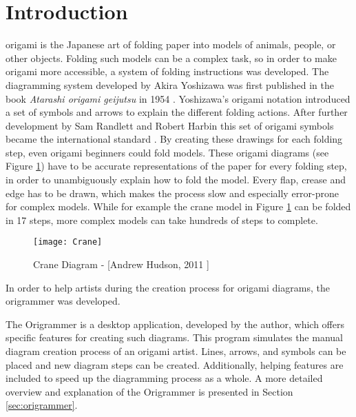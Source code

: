 
\section{Introduction}
\label{sec:introduction}

\gls{origami} is the Japanese art of folding paper into models of animals, people, or other objects. Folding such models can be a complex task, so in order to make origami more accessible, a system of folding instructions was developed. The diagramming system developed by Akira Yoshizawa was first published in the book \emph{Atarashi origami geijutsu} in 1954 \cite{Yoshizawa}. Yoshizawa's origami notation introduced a set of symbols and arrows to explain the different folding actions. After further development by Sam Randlett and Robert Harbin this set of origami symbols became the international standard \cite{origamiHistoryWu} \cite{origamiHistoryK}.
By creating these drawings for each folding step, even origami beginners could fold models. These origami diagrams (see Figure \ref{fig:craneDiagram}) have to be accurate representations of the paper for every folding step, in order to unambiguously explain how to fold the model. Every flap, crease and edge has to be drawn, which makes the process slow and especially error-prone for complex models. While for example the crane model in Figure \ref{fig:craneDiagram} can be folded in 17 steps, more complex models can take hundreds of steps to complete. 

\begin{figure}[htbp]
	\centering
	\texttt{[image: Crane]}
	\caption[Crane Diagram]{Crane Diagram - [Andrew Hudson, 2011 \cite{Hudson}]}
	\label{fig:craneDiagram}
\end{figure}

\noindent In order to help artists during the creation process for origami diagrams, the \gls{origrammer} \cite{origrammer} was developed.

The Origrammer is a desktop application, developed by the author, which offers specific features for creating such diagrams. This program simulates the manual diagram creation process of an origami artist. Lines, arrows, and symbols can be placed and new diagram steps can be created. Additionally, helping features are included to speed up the diagramming process as a whole. A more detailed overview and explanation of the Origrammer is presented in Section \ref{sec:origrammer}.

